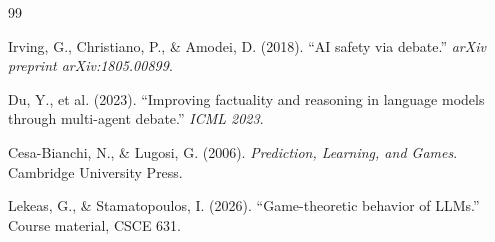\documentclass[11pt, oneside]{article}
\begin{document}

\begin{thebibliography}{99}

 Irving, G., Christiano, P., \& Amodei, D. (2018). ``AI safety via debate.'' \textit{arXiv preprint arXiv:1805.00899}.

 Du, Y., et al. (2023). ``Improving factuality and reasoning in language models through multi-agent debate.'' \textit{ICML 2023}.

 Cesa-Bianchi, N., \& Lugosi, G. (2006). \textit{Prediction, Learning, and Games}. Cambridge University Press.

 Lekeas, G., \& Stamatopoulos, I. (2026). ``Game-theoretic behavior of LLMs.'' Course material, CSCE 631.

\end{thebibliography}
\end{document}
